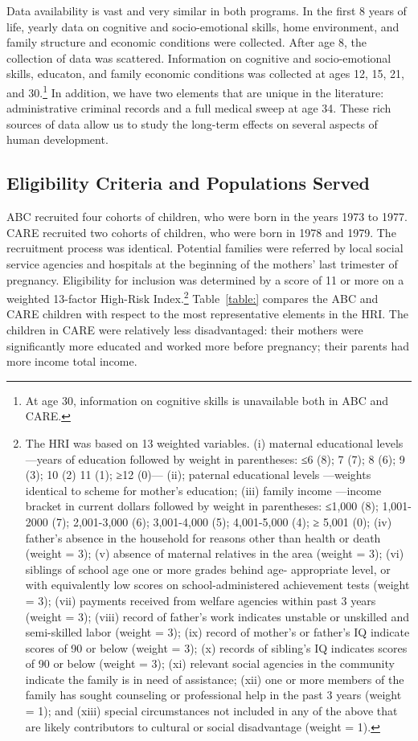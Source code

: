\noindent Data availability is vast and very similar in both programs. In the first 8 years of life, yearly data on cognitive and socio-emotional skills, home environment, and family structure and economic conditions were collected. After age 8, the collection of data was scattered. Information on cognitive and socio-emotional skills, educaton, and family economic conditions was collected at ages 12, 15, 21, and 30.\footnote{At age 30, information on cognitive skills is unavailable both in ABC and CARE.} In addition, we have two elements that are unique in the literature: administrative criminal records and a full medical sweep at age 34. These rich sources of data allow us to study the long-term effects on several aspects of human development.

\subsection{Eligibility Criteria and Populations Served} \label{section:eligibility}

\noindent ABC recruited four cohorts of children, who were born in the years 1973 to 1977. CARE recruited two cohorts of children, who were born in 1978 and 1979. The recruitment process was identical. Potential families were referred by local social service agencies and hospitals at the beginning of the mothers' last trimester of pregnancy. Eligibility for inclusion was determined by a score of 11 or more on a weighted 13-factor High-Risk Index.\footnote{The HRI was based on 13 weighted variables. (i) maternal educational levels —years of education followed by weight in parentheses: ≤6 (8); 7 (7); 8 (6); 9 (3); 10 (2) 11 (1); ≥12 (0)— (ii); paternal educational levels —weights identical to scheme for mother’s education; (iii) family income —income bracket in current dollars followed by weight in parentheses: ≤1,000 (8); 1,001-2000 (7); 2,001-3,000 (6); 3,001-4,000 (5); 4,001-5,000 (4); ≥ 5,001 (0); (iv) father’s absence in the household for reasons other than health or death (weight = 3); (v) absence of maternal relatives in the area (weight = 3); (vi) siblings of school age one or more grades behind age- appropriate level, or with equivalently low scores on school-administered achievement tests (weight = 3); (vii) payments received from welfare agencies within past 3 years (weight = 3); (viii) record of father’s work indicates unstable or unskilled and semi-skilled labor (weight = 3); (ix) record of mother’s or father’s IQ indicate scores of 90 or below (weight = 3); (x) records of sibling’s IQ indicates scores of 90 or below (weight = 3); (xi) relevant social agencies in the community indicate the family is in need of assistance; (xii) one or more members of the family has sought counseling or professional help in the past 3 years (weight = 1); and (xiii) special circumstances not included in any of the above that are likely contributors to cultural or social disadvantage (weight = 1).} Table~\ref{table:} compares the ABC and CARE children with respect to the most representative elements in the HRI. The children in CARE were relatively less disadvantaged: their mothers were significantly more educated and worked more before pregnancy; their parents had more income total income.\\

